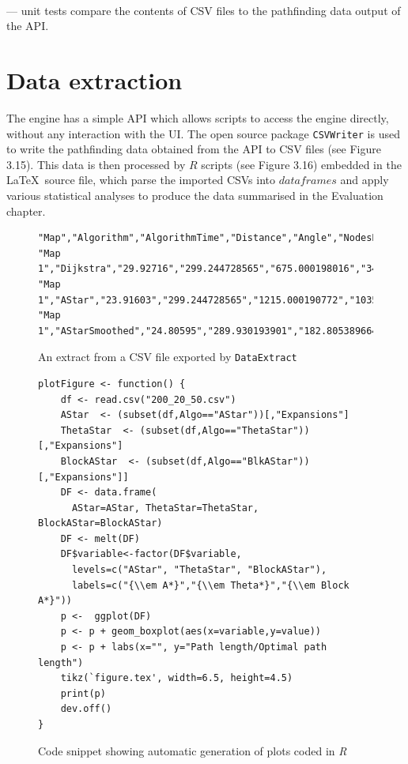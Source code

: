 \documentclass[12pt,notitlepage]{report}
\begin{document}
\\

 --- unit tests compare the contents of CSV files to the pathfinding data output of the API.

\section{Data extraction}

The engine has a simple API which allows scripts to access the engine directly, without any interaction with the UI. The open source package {\tt CSVWriter} is used to write the pathfinding data obtained from the API to CSV files (see Figure 3.15). This data is then processed by $R$ scripts (see Figure 3.16) embedded in the \LaTeX\ source file, which parse the imported CSVs into $dataframes$ and apply various statistical analyses to produce the data summarised in the Evaluation chapter.

\begin{figure}
\begin{lstlisting}
"Map","Algorithm","AlgorithmTime","Distance","Angle","NodesExpanded"
"Map 1","Dijkstra","29.92716","299.244728565","675.000198016","34471"
"Map 1","AStar","23.91603","299.244728565","1215.000190772","10352"
"Map 1","AStarSmoothed","24.80595","289.930193901","182.805389664","10579"
\end{lstlisting}
\caption{An extract from a CSV file exported by {\tt DataExtract}}
\end{figure}


\begin{figure}
\begin{lstlisting}
plotFigure <- function() {
    df <- read.csv("200_20_50.csv")
    AStar  <- (subset(df,Algo=="AStar"))[,"Expansions"]
    ThetaStar  <- (subset(df,Algo=="ThetaStar"))[,"Expansions"]
    BlockAStar  <- (subset(df,Algo=="BlkAStar"))[,"Expansions"]] 
    DF <- data.frame(
      AStar=AStar, ThetaStar=ThetaStar, BlockAStar=BlockAStar)
    DF <- melt(DF)
    DF$variable<-factor(DF$variable,
      levels=c("AStar", "ThetaStar", "BlockAStar"),
      labels=c("{\\em A*}","{\\em Theta*}","{\\em Block A*}"))   
    p <-  ggplot(DF)
    p <- p + geom_boxplot(aes(x=variable,y=value))
    p <- p + labs(x="", y="Path length/Optimal path length")
    tikz(`figure.tex', width=6.5, height=4.5)
    print(p)
    dev.off()
}
\end{lstlisting}
\caption{Code snippet showing automatic generation of plots coded in {\em R}}
\end{figure}
\end{document}
